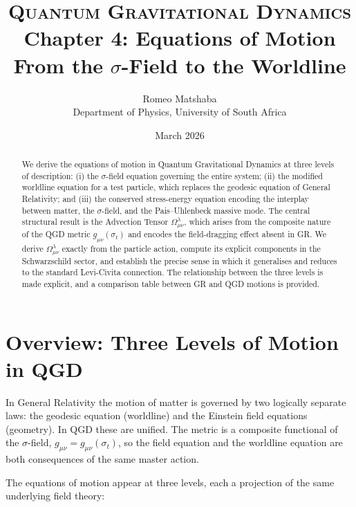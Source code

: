\documentclass[11pt,a4paper]{article}
\title{%
  \vspace{-1.2cm}
  {\large\scshape Quantum Gravitational Dynamics}\\[6pt]
  {\LARGE\bfseries Chapter 4: Equations of Motion}\\[8pt]
  {\normalsize From the $\sigma$-Field to the Worldline}
}
\author{%
  Romeo Matshaba\\[4pt]
  \normalsize Department of Physics, University of South Africa
}
\date{March 2026}
\theoremstyle{plain}
\theoremstyle{definition}
\theoremstyle{remark}
\begin{document}
\maketitle
\thispagestyle{empty}

\begin{abstract}
\noindent
We derive the equations of motion in Quantum Gravitational Dynamics at three levels
of description: (i) the $\sigma$-field equation governing the entire system; (ii) the
modified worldline equation for a test particle, which replaces the geodesic equation
of General Relativity; and (iii) the conserved stress-energy equation encoding the
interplay between matter, the $\sigma$-field, and the Pais--Uhlenbeck massive mode.
The central structural result is the Advection Tensor $\Omega^\lambda_{\mu\nu}$, which
arises from the composite nature of the QGD metric $g_{\mu\nu}(\sigma_t)$ and encodes
the field-dragging effect absent in GR.  We derive $\Omega^\lambda_{\mu\nu}$ exactly
from the particle action, compute its explicit components in the Schwarzschild sector,
and establish the precise sense in which it generalises and reduces to the standard
Levi-Civita connection.  The relationship between the three levels is made explicit,
and a comparison table between GR and QGD motions is provided.
\end{abstract}

\tableofcontents
\newpage

\section{Overview: Three Levels of Motion in QGD}
\label{sec:overview}

In General Relativity the motion of matter is governed by two logically separate
laws: the geodesic equation (worldline) and the Einstein field equations (geometry).
In QGD these are unified.  The metric is a composite functional of the $\sigma$-field,
$g_{\mu\nu} = g_{\mu\nu}(\sigma_t)$, so the field equation and the worldline equation
are both consequences of the same master action.

The equations of motion appear at three levels, each a projection of the same
underlying field theory:
\end{document}
